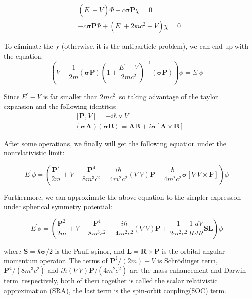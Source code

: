 \documentclass[a4paper]{report}
\begin{document}
\begin{equation}
\begin{split}
&(E^{\prime} - V) \Phi - c \boldsymbol{\sigma} \textbf{P} \chi = 0\\                
&-c\boldsymbol{\sigma} \textbf{P} \Phi + (E^{\prime}+2mc^2-V)\chi = 0
\end{split}
\end{equation}

\noindent To eliminate the $\chi$ (otherwise, it is the antiparticle problem), we can end up with the equation:
  \begin{equation}
(V + \frac{1}{2m} (\boldsymbol{\sigma} \textbf{P}) (1+\frac{E^{\prime}-V}{2mc^2})^{-1} (\boldsymbol{\sigma} \textbf{P}) )\phi=E^{\prime}\phi
\end{equation}

\noindent Since ${E^{\prime}-V}$ is far smaller than ${2mc^2}$, so taking advantage of the taylor expansion and the following identites:
\begin{equation}
\begin{split}
& [\textbf{P}, V ]= -i \hbar \triangledown V \\                
&(\boldsymbol{\sigma} \textbf{A} )(\boldsymbol{\sigma} \textbf{B}) = \textbf{A} \textbf{B} + i\boldsymbol{\sigma}[\textbf{A} \times \textbf{B}]
\end{split}
\end{equation}


\noindent After some operations, we finally will get the following equation under the nonrelativistic limit:

\begin{equation}
E^{\prime} \phi = (\frac{\textbf{P}^2}{2m} + V - \frac{\textbf{P}^4}{8 {m}^3 {c}^2}-\frac{i\hbar}{4{m}^2 {c}^2} (\nabla{V})\textbf{P}+\frac{\hbar}{4 m^2 c^2} \boldsymbol{\sigma}[\nabla{V} \times \textbf{P}]) \phi
\end{equation}


\noindent Furthermore, we can approximate the above equation to the simpler expression under spherical symmetry potential:

\begin{equation}
 E^{\prime} \phi = (\frac{\textbf{P}^2}{2m} +V - \frac{\textbf{P}^4}{8 {m}^3 {c}^2}-\frac{i\hbar}{4{m}^2 {c}^2} (\nabla{V})\textbf{P}+\frac{1}{2 m^2 c^2} \frac{1}{R} \frac{dV}{dR}\textbf{S}\textbf{L}) \phi
\end{equation}

\noindent where $\textbf{S}={\hbar}{\boldsymbol{\sigma}}/2$ is the Pauli spinor, and $\textbf{L}=\textbf{R} \times \textbf{P}$ is the orbital
angular momentum operator. The terms of ${\textbf{P}^2}/(2m) + V$ is Schrödinger term,  ${\textbf{P}^4}/(8 {m}^3 {c}^2)$ and ${i\hbar} (\nabla{V})\textbf{P} /(4{m}^2 {c}^2)$  are the mass enhancement 
and Darwin term, respectively, both of them together is called the scalar relativistic approximation (SRA), the last term is the spin-orbit coupling(SOC) term.
\end{document}
